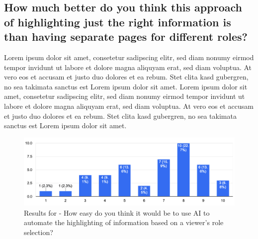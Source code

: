\subsection{How much better do you think this approach of highlighting just the right information is than having separate pages for different roles?}
Lorem ipsum dolor sit amet, consetetur sadipscing elitr, sed diam nonumy eirmod tempor invidunt ut labore et dolore magna aliquyam erat, sed diam voluptua. At vero eos et accusam et justo duo dolores et ea rebum. Stet clita kasd gubergren, no sea takimata sanctus est Lorem ipsum dolor sit amet. Lorem ipsum dolor sit amet, consetetur sadipscing elitr, sed diam nonumy eirmod tempor invidunt ut labore et dolore magna aliquyam erat, sed diam voluptua. At vero eos et accusam et justo duo dolores et ea rebum. Stet clita kasd gubergren, no sea takimata sanctus est Lorem ipsum dolor sit amet.
\begin{figure}[h!]
\centering
\includegraphics[width=\linewidth]{Images/Survey/documents_4.png}
\caption{Results for - How easy do you think it would be to use AI to automate the highlighting of information based on a viewer's role selection?}
\label{fig:results:highlighting:4}
\end{figure}

